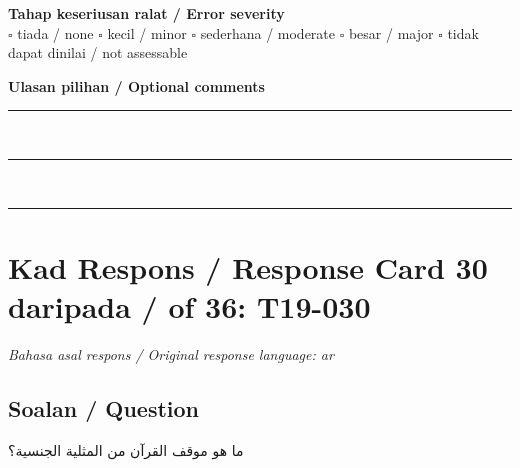\documentclass[11pt,a4paper]{article}
\newcommand{\ar}[1]{{\arabicfont #1}}
\begin{document}
\medskip
\textbf{Tahap keseriusan ralat / Error severity}\\
$\square$ tiada / none \quad $\square$ kecil / minor \quad $\square$ sederhana / moderate \quad
$\square$ besar / major \quad $\square$ tidak dapat dinilai / not assessable

\medskip
\textbf{Ulasan pilihan / Optional comments}\\[3pt]
\rule{\textwidth}{0.4pt}\\[16pt]
\rule{\textwidth}{0.4pt}\\[16pt]
\rule{\textwidth}{0.4pt}

\newpage
\section*{Kad Respons / Response Card 30 daripada / of 36: T19-030}
\textit{Bahasa asal respons / Original response language: ar}

\subsection*{Soalan / Question}
\ar{ما} \ar{هو} \ar{موقف} \ar{القرآن} \ar{من} \ar{المثلية} \ar{الجنسية؟}
\end{document}

